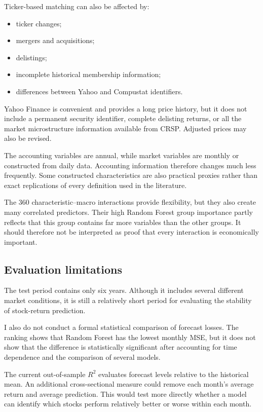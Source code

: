 \documentclass[11pt,a4paper]{article}
\begin{document}
Ticker-based matching can also be affected by:

\begin{itemize}
  \item ticker changes;
  \item mergers and acquisitions;
  \item delistings;
  \item incomplete historical membership information;
  \item differences between Yahoo and Compustat identifiers.
\end{itemize}

Yahoo Finance is convenient and provides a long price history, but it does not
include a permanent security identifier, complete delisting returns, or all the
market microstructure information available from CRSP. Adjusted prices may also
be revised.

The accounting variables are annual, while market variables are monthly or
constructed from daily data. Accounting information therefore changes much
less frequently. Some constructed characteristics are also practical proxies
rather than exact replications of every definition used in the literature.

The 360 characteristic--macro interactions provide flexibility, but they also
create many correlated predictors. Their high Random Forest group importance
partly reflects that this group contains far more variables than the other
groups. It should therefore not be interpreted as proof that every interaction
is economically important.

\subsection{Evaluation limitations}

The test period contains only six years. Although it includes several different
market conditions, it is still a relatively short period for evaluating the
stability of stock-return prediction.

I also do not conduct a formal statistical comparison of forecast losses. The
ranking shows that Random Forest has the lowest monthly MSE, but it does not
show that the difference is statistically significant after accounting for
time dependence and the comparison of several models.

The current out-of-sample \(R^2\) evaluates forecast levels relative to the
historical mean. An additional cross-sectional measure could remove each
month's average return and average prediction. This would test more directly
whether a model can identify which stocks perform relatively better or worse
within each month.
\end{document}
